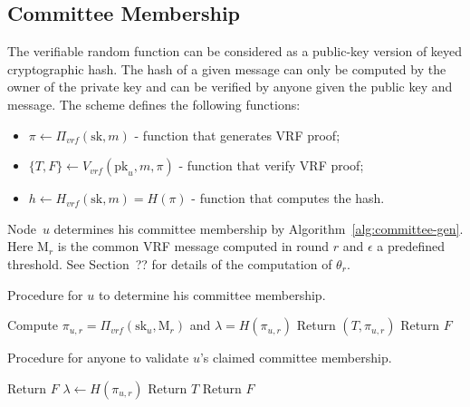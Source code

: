 \documentclass{article}
\begin{document}
\subsection{Committee Membership}
\label{sec:committee}
The verifiable random function can be considered as a public-key version of keyed cryptographic hash. The hash of a given message can only be computed by the owner of the private key and can be verified by anyone given the public key and message. The scheme defines the following functions:
\begin{itemize}
    \item $\pi\leftarrow\Pi_{vrf}(\textrm{sk},m)$ - function that generates VRF proof;
    \item $\{T, F\}\leftarrow V_{vrf}(\textrm{pk}_u,m,\pi)$ - function that verify VRF proof;
    \item $h\leftarrow H_{vrf}(\textrm{sk},m)=H(\pi)$ - function that computes the hash.
\end{itemize}

Node~$u$ determines his committee membership by Algorithm~\ref{alg:committee-gen}. Here $\textrm{M}_r$ is the common VRF message computed in round $r$ and $\epsilon$ a predefined threshold. {\color{red} See Section~?? for details of the computation of $\theta_r$.}

\begin{algorithm}[H]
\caption{Procedure for $u$ to determine his committee membership. }
\label{alg:committee-gen}
\begin{spacing}{1.2}
\begin{algorithmic}[1]
    \vspace{1ex}
    \State Compute $\pi_{u,r} = \Pi_{vrf}(\textrm{sk}_u,\textrm{M}_r)$ and $\lambda=H\left(\pi_{u,r}\right)$
    \If{$\lambda\leq\epsilon$}
        \State Return $\left(T,\pi_{u,r}\right)$
    \Else 
        \State Return $F$
    \EndIf
\end{algorithmic}
\end{spacing}
\end{algorithm}

\begin{algorithm}[H]
\caption{Procedure for anyone to validate $u$'s claimed committee membership.}
\label{alg:committee-valid}
\begin{spacing}{1.2}
\begin{algorithmic}[1]
    \vspace{1ex}
        \State Return $F$
    \EndIf
    \State $\lambda\leftarrow H(\pi_{u,r})$
    \If{$\lambda\leq\epsilon$}
        \State Return $T$
    \Else 
        \State Return $F$
    \EndIf
\end{algorithmic}
\end{spacing}
\end{algorithm}
\end{document}
